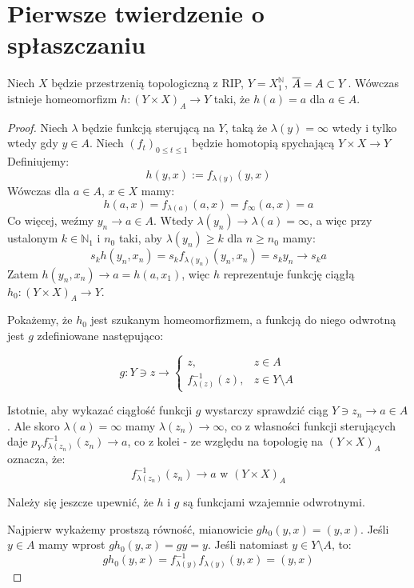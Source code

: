 \section{Pierwsze twierdzenie o spłaszczaniu}
\begin{thm}
  Niech $X$ będzie przestrzenią topologiczną z RIP, $Y = X^\mathbb{N}_1$, $\overline{A} = A \subset Y$. Wówczas istnieje homeomorfizm $h: (Y \times X)_A \rightarrow Y$ taki, że $h(a) = a$ dla $a \in A$.
  
  \begin{proof}
    Niech $\lambda$ będzie funkcją sterującą na $Y$, taką że $\lambda(y) = \infty$ wtedy i tylko wtedy gdy $y \in A$.
    Niech $(f_t)_{0 \leq t \leq 1}$ będzie homotopią spychającą $Y \times X \rightarrow Y$
    Definiujemy:
    \[h(y,x) := f_{\lambda(y)}(y,x)\]
    Wówczas dla $a \in A$, $x \in X$ mamy:
    \[h(a,x) = f_{\lambda(a)}(a,x) = f_\infty(a,x) = a\]
    Co więcej, weźmy $y_n \rightarrow a \in A$. Wtedy $\lambda(y_n) \rightarrow \lambda(a) = \infty$, a więc przy ustalonym $k \in \mathbb{N}_1$ i $n_0$ taki, aby $\lambda(y_n) \geq k$ dla $n \geq n_0$ mamy:
    \[s_k h(y_n, x_n) = s_k f_{\lambda(y_n)}(y_n,x_n) = s_k y_n \rightarrow s_k a\]
    Zatem $h(y_n,x_n) \rightarrow a = h(a, x_1)$, więc $h$ reprezentuje funkcję ciągłą $h_0: (Y \times X)_A \rightarrow Y$.
    
    Pokażemy, że $h_0$ jest szukanym homeomorfizmem, a funkcją do niego odwrotną jest $g$ zdefiniowane następująco:
    
    \[g: Y \ni z \rightarrow
    \begin{cases}
      z,& z\in A \\
      f^{-1}_{\lambda(z)}(z),& z \in Y \setminus A
    \end{cases}\]
    
    Istotnie, aby wykazać ciągłość funkcji $g$ wystarczy sprawdzić ciąg $Y \ni z_n \rightarrow a \in A$. Ale skoro $\lambda(a) = \infty$ mamy $\lambda(z_n) \rightarrow \infty$, co z własności funkcji sterujących daje $p_Y f_{\lambda(z_n)}^{-1}(z_n) \rightarrow a$, co z kolei - ze względu na topologię na $(Y \times X)_A$ oznacza, że:
    \[f_{\lambda(z_n)}^{-1}(z_n) \rightarrow a \mbox{ w } (Y \times X)_A\]

    Należy się jeszcze upewnić, że $h$ i $g$ są funkcjami wzajemnie odwrotnymi.
    
    Najpierw wykażemy prostszą równość, mianowicie $gh_0(y,x) = (y,x)$. Jeśli $y \in A$ mamy wprost $gh_0(y,x) = gy = y$. Jeśli natomiast $y \in Y \setminus A$, to:
    \[gh_0(y,x) = f^{-1}_{\lambda(y)} f_{\lambda(y)}(y,x) = (y,x)\]
    

\end{proof}
\end{thm}
